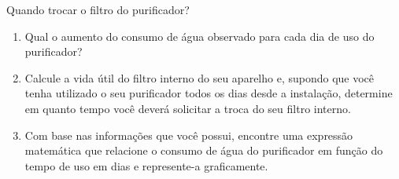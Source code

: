 \begin{task}{Quando trocar o filtro do purificador?}
\begin{enumerate}
\item Qual o aumento do consumo de água observado para cada dia de uso do purificador?

\item Calcule a vida útil do filtro interno do seu aparelho e, supondo que você tenha utilizado o seu purificador todos os dias desde a instalação, determine em quanto tempo você deverá solicitar a troca do seu filtro interno.

\item Com base nas informações que você possui, encontre uma expressão matemática que relacione o consumo de água do purificador em função do tempo de uso em dias e represente-a graficamente.
\end{enumerate}

\end{task}

